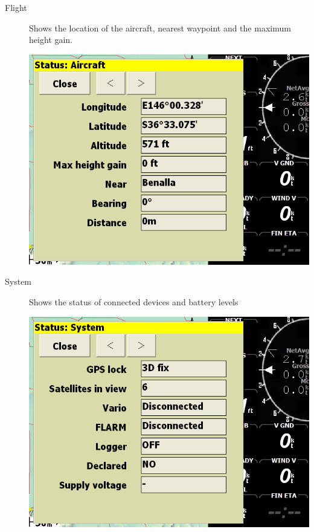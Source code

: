 \documentclass[a4paper,12pt]{refrep}
\begin{document}
\begin{description}
\item[Flight] Shows the location of the aircraft, nearest waypoint and the
maximum height gain.
\begin{center}
\includegraphics[angle=0,width=\linewidth,keepaspectratio='true']{figures/status-aircraft.png}
\end{center}

\item[System] Shows the status of connected devices and battery levels
\begin{center}
\includegraphics[angle=0,width=\linewidth,keepaspectratio='true']{figures/status-system.png}
\end{center}


\end{description}
\end{document}
